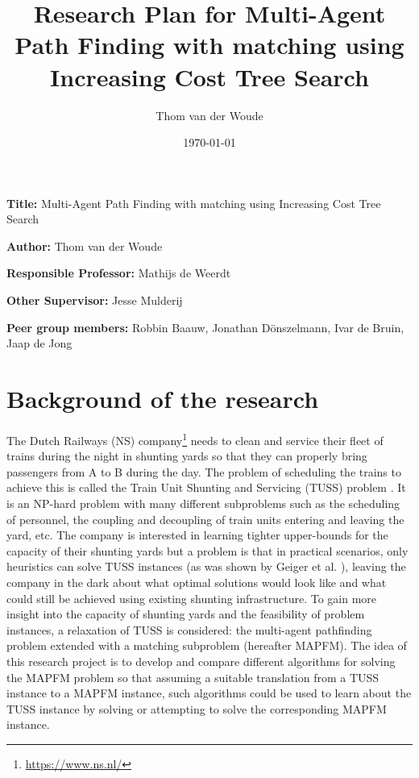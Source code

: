 \documentclass[a4paper,10pt,english]{article}
\title{Research Plan for Multi-Agent Path Finding with matching using Increasing Cost Tree Search}
\author{Thom van der Woude}
\date{\today}
\newcommand{\namelistlabel}[1]{\mbox{#1}\hfil}
\newenvironment{namelist}[1]{%
	\begin{list}{}
		{
			\let\makelabel\namelistlabel
			\settowidth{\labelwidth}{#1}
			\setlength{\leftmargin}{1.1\labelwidth}
		}
	}{
\end{list}}
\begin{document}
	\maketitle
	\begin{namelist}{xxxxxxxxxxxxxxxxxxxxxxxxxxxxxxxxxxxxxxx}
		\item[{\bf Title:}]
		Multi-Agent Path Finding with matching using Increasing Cost Tree Search
		\item[{\bf Author:}]
		Thom van der Woude
		\item[{\bf Responsible Professor:}]
		Mathijs de Weerdt
		\item[{\bf Other Supervisor:}]
		Jesse Mulderij
		\item[{\bf Peer group members:}]
		Robbin Baauw, Jonathan Dönszelmann, Ivar de Bruin, Jaap de Jong
	\end{namelist}
	
	\section*{Background of the research}
	The Dutch Railways (NS) company\footnote{\url{https://www.ns.nl/}} needs to clean and service their fleet of trains during the night in shunting yards so that they can properly bring passengers from A to B during the day. The problem of scheduling the trains to achieve this is called the Train Unit Shunting and Servicing (TUSS) problem \cite{mulderij2020}. It is an NP-hard problem with many different subproblems such as the scheduling of personnel, the coupling and decoupling of train units entering and leaving the yard, etc. The company is interested in learning tighter upper-bounds for the capacity of their shunting yards but a problem is that in practical scenarios, only heuristics can solve TUSS instances (as was shown by Geiger et al. \cite{geiger2018}), leaving the company in the dark about what optimal solutions would look like and what could still be achieved using existing shunting infrastructure. To gain more insight into the capacity of shunting yards and the feasibility of problem instances, a relaxation of TUSS is considered: the multi-agent pathfinding problem extended with a matching subproblem (hereafter MAPFM). The idea of this research project is to develop and compare different algorithms for solving the MAPFM problem so that assuming a suitable translation from a TUSS instance to a MAPFM instance, such algorithms could be used to learn about the TUSS instance by solving or attempting to solve the corresponding MAPFM instance.
\end{document}
